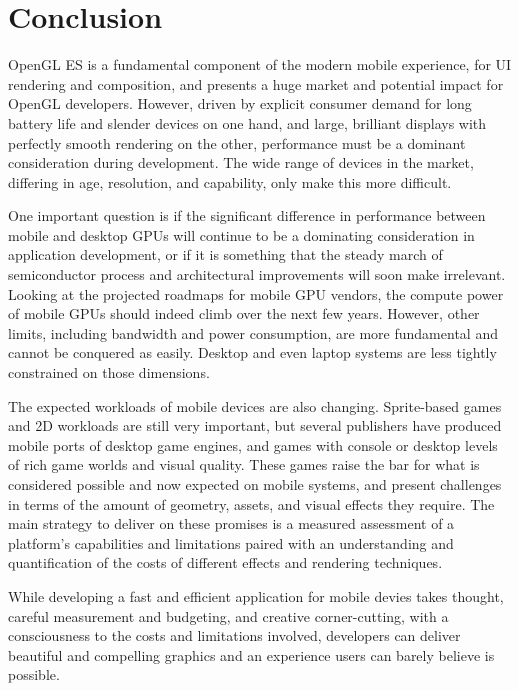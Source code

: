 \section{Conclusion}\label{Jon-McCaffrey-Conclusion}

OpenGL ES is a fundamental component of the modern mobile experience, for UI
rendering and composition, \cite{Guy11} and presents a huge market and
potential impact for OpenGL developers.  However, driven by explicit consumer
demand for long battery life and slender devices on one hand, and large,
brilliant displays with perfectly smooth rendering on the other, performance
must be a dominant consideration during development.  The wide range of devices
in the market, differing in age, resolution, and capability, only make
this more difficult.

One important question is if the significant difference in performance
between
 mobile and desktop GPUs will continue to be a dominating
consideration in application development, or if
 it is something that the
steady march of semiconductor process and
 architectural improvements will
soon make irrelevant.  Looking at the projected
 roadmaps for mobile GPU
vendors, the compute power of mobile GPUs should indeed
 climb over the next
few years.  However, other limits, including bandwidth and
 power consumption,
are more fundamental and cannot be conquered as easily.  Desktop and even
laptop systems are less tightly constrained on those dimensions.

The expected workloads of mobile devices are also changing.  Sprite-based games
and 2D workloads are still very important, but several publishers have
produced mobile ports of desktop game engines, and games with console or
desktop levels of rich game worlds and visual quality.  These games raise the
bar for what is considered possible and now expected on mobile systems, and
present challenges in terms of the amount of geometry, assets, and visual
effects they require.  The main strategy to deliver on these promises is a
measured assessment of a platform's capabilities and limitations paired with an
understanding and quantification of the costs of different effects and
rendering techniques.  

While developing a fast and efficient application for mobile devies takes
thought, careful measurement and budgeting, and creative corner-cutting, with a
consciousness to the costs and limitations involved, developers can deliver
beautiful and compelling graphics and an experience users can barely believe is
possible.

 











